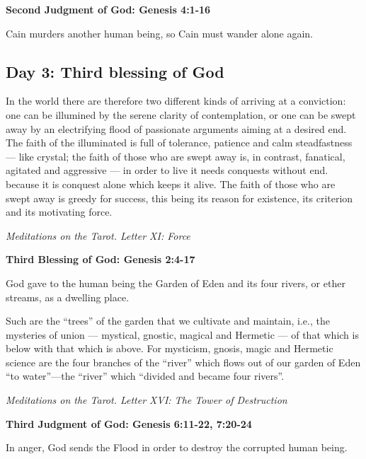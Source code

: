\textbf{Second Judgment of God: Genesis 4:1-16}

Cain murders another human being, so Cain must wander alone again.

\subsection*{Day 3: Third blessing of God}
\begin{quotationx}
In the world there are therefore two different kinds of arriving at a conviction: one can be illumined by the serene
clarity of contemplation, or one can be swept away by an electrifying flood of passionate arguments aiming at a desired
end. The faith of the illuminated is full of tolerance, patience and calm steadfastness — like
crystal; the faith of those who are swept away is, in contrast, fanatical, agitated and aggressive
— in order to live it needs conquests without end. because it is conquest alone which keeps it
alive. The faith of those who are swept away is greedy for success, this being its reason for existence, its criterion
and its motivating force. \begin{flushright} \emph{Meditations on the Tarot. Letter XI: Force}\end{flushright}

\end{quotationx}

\textbf{Third Blessing of God: Genesis 2:4-17}

God gave to the human being the Garden of Eden and its four rivers, or ether streams, as a dwelling place.

\begin{quotationx}
Such are the “trees” of the garden that we cultivate and maintain, i.e., the mysteries of union —
mystical, gnostic, magical and Hermetic — of that which is below with that which is above. For
mysticism, gnosis, magic and Hermetic science are the four branches of the “river” which flows out of our garden of
Eden “to water”—the “river” which “divided and became four rivers”. \begin{flushright} \emph{Meditations on the Tarot. Letter XVI: The Tower of Destruction}\end{flushright}

\end{quotationx}

\textbf{Third Judgment of God: Genesis 6:11-22, 7:20-24}

In anger, God sends the Flood in order to destroy the corrupted human being.

